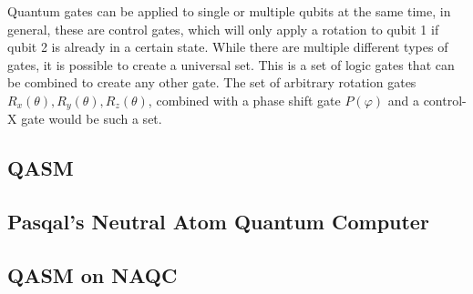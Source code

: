 Quantum gates can be applied to single or multiple qubits at the same time, in general, these are control gates, which will only apply a rotation to qubit 1 if qubit 2
is already in a certain state. While there are multiple different types of gates, it is possible to create a universal set. This is a set of logic gates that can be
combined to create any other gate. The set of arbitrary rotation gates $R_x(\theta), R_y(\theta), R_z(\theta)$, combined with a phase shift gate $P(\varphi)$ and a control-X 
gate would be such a set.


\subsection{QASM}
\label{sec:Qasm}

\subsection{Pasqal's Neutral Atom Quantum Computer}
\label{sec:NAQC}


\subsection{QASM on NAQC}
\label{sec:QASM_NAQC}
